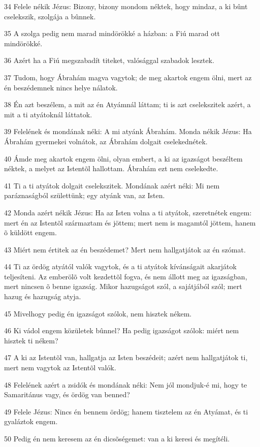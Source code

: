 \par 34 Felele nékik Jézus: Bizony, bizony mondom néktek, hogy mindaz, a ki bûnt cselekszik, szolgája a bûnnek.
\par 35 A szolga pedig nem marad mindörökké a házban: a Fiú marad ott mindörökké.
\par 36 Azért ha a Fiú megszabadít titeket, valósággal szabadok lesztek.
\par 37 Tudom, hogy Ábrahám magva vagytok; de meg akartok engem ölni, mert az én beszédemnek nincs helye nálatok.
\par 38 Én azt beszélem, a mit az én Atyámnál láttam; ti  is azt cselekszitek azért, a mit a ti atyátoknál láttatok.
\par 39 Felelének és mondának néki: A mi atyánk Ábrahám. Monda nékik Jézus: Ha Ábrahám gyermekei volnátok, az Ábrahám dolgait cselekednétek.
\par 40 Ámde meg akartok engem ölni, olyan embert, a ki az igazságot beszéltem néktek, a melyet az Istentõl hallottam. Ábrahám ezt nem cselekedte.
\par 41 Ti a ti atyátok dolgait cselekszitek. Mondának azért néki: Mi nem paráznaságból születtünk; egy atyánk van, az Isten.
\par 42 Monda azért nékik Jézus: Ha az Isten volna a ti atyátok, szeretnétek engem: mert én az Istentõl származtam és jöttem; mert nem is magamtól jöttem, hanem õ küldött engem.
\par 43 Miért nem értitek az én beszédemet? Mert nem hallgatjátok az én szómat.
\par 44 Ti az ördög atyától valók vagytok, és a ti atyátok kívánságait akarjátok teljesíteni. Az emberölõ volt kezdettõl fogva, és nem állott  meg az igazságban, mert nincsen õ benne igazság. Mikor hazugságot szól, a sajátjából szól; mert hazug és hazugság atyja.
\par 45 Mivelhogy pedig én igazságot szólok, nem hisztek nékem.
\par 46 Ki vádol engem közületek bûnnel? Ha pedig igazságot szólok: miért nem hisztek ti nékem?
\par 47 A ki az Istentõl van, hallgatja az Isten beszédeit; azért nem hallgatjátok ti, mert nem vagytok az Istentõl valók.
\par 48 Felelének azért a zsidók és mondának néki: Nem jól mondjuk-é mi, hogy te Samaritánus vagy, és ördög van benned?
\par 49 Felele Jézus: Nincs én bennem ördög; hanem tisztelem az én Atyámat, és ti gyaláztok engem.
\par 50 Pedig én nem keresem az én dicsõségemet: van a ki keresi és megítéli.
